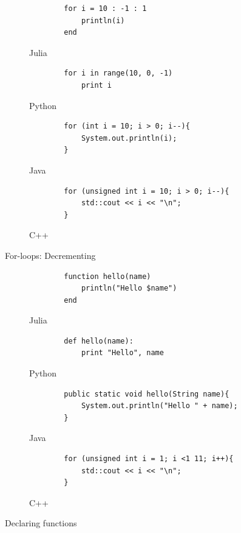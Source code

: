\documentclass[a4paper,11pt]{article}
\begin{document}
\begin{figure}
	\centering
	\begin{subfigure}[b]{0.7\textwidth}
		\centering
		\begin{lstlisting}
		for i = 10 : -1 : 1
			println(i)
		end
		\end{lstlisting}
		\caption{Julia}
	\end{subfigure}
	\begin{subfigure}[b]{0.7\textwidth}
		\centering
		\begin{lstlisting}
		for i in range(10, 0, -1)
			print i
		\end{lstlisting}
		\caption{Python}
	\end{subfigure}	
	\begin{subfigure}[b]{0.7\textwidth}
		\centering
		\begin{lstlisting}
		for (int i = 10; i > 0; i--){
			System.out.println(i);
		}
		\end{lstlisting}
		\caption{Java}
	\end{subfigure}
	\begin{subfigure}[b]{0.7\textwidth}
		\centering
		\begin{lstlisting}
		for (unsigned int i = 10; i > 0; i--){
			std::cout << i << "\n";
		}
		\end{lstlisting}
		\caption{C++}
	\end{subfigure}
	\caption{For-loops: Decrementing}
	\label{forloop-}
\end{figure}

\begin{figure}
	\centering
	\begin{subfigure}[b]{0.7\textwidth}
		\centering
		\begin{lstlisting}
		function hello(name)
			println("Hello $name")
		end
		\end{lstlisting}
		\caption{Julia}
	\end{subfigure}
	\begin{subfigure}[b]{0.7\textwidth}
		\centering
		\begin{lstlisting}
		def hello(name):
			print "Hello", name
		\end{lstlisting}
		\caption{Python}
	\end{subfigure}	
	\begin{subfigure}[b]{0.7\textwidth}
		\centering
		\begin{lstlisting}
		public static void hello(String name){
			System.out.println("Hello " + name);
		}
		\end{lstlisting}
		\caption{Java}
	\end{subfigure}
	\begin{subfigure}[b]{0.7\textwidth}
		\centering
		\begin{lstlisting}
		for (unsigned int i = 1; i <1 11; i++){
			std::cout << i << "\n";
		}
		\end{lstlisting}
		\caption{C++}
	\end{subfigure}
	\caption{Declaring functions}
	\label{function}
\end{figure}
\end{document}
